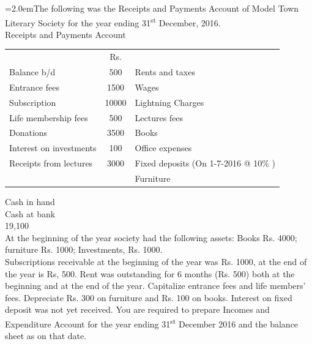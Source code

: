 \documentclass[11pt,a4paper]{article}
\newcommand{\lqn}[2]{\Needspace{6\baselineskip}\par\medskip\noindent\hangindent=2.0em\hangafter=1\makebox[2.0em][l]{\textbf{#1.}}#2\par}
\begin{document}
\lqn{26}{The following was the Receipts and Payments Account of Model Town Literary Society for the year ending 31\textsuperscript{st}  December, 2016.\\
Receipts and Payments Account\par
\par\smallskip\noindent\hspace*{1.2em}\begin{tabular}{lcl}
 & Rs. &  \\
Balance b/d & 500 & Rents and taxes \\
Entrance fees & 1500 & Wages \\
Subscription & 10000 & Lightning Charges \\
Life membership fees & 500 & Lectures fees \\
Donations & 3500 & Books \\
Interest on investments & 100 & Office expenses \\
Receipts from lectures & 3000 & Fixed deposits (On 1-7-2016 @ 10\% ) \\
 &  & Furniture \\
\end{tabular}\par\smallskip
Cash in hand\\
Cash at bank\\
19,100\\
At the beginning of the year society had the following assets: Books Rs. 4000; furniture Rs. 1000; Investments, Rs. 1000.\\
Subscriptions receivable at the beginning of the year was Rs. 1000, at the end of the year is Rs, 500. Rent was outstanding for 6 months (Rs. 500) both at the beginning and at the end of the year. Capitalize entrance fees and life members’ fees. Depreciate Rs. 300 on furniture and Rs. 100 on books. Interest on fixed deposit was not yet received. You are required to prepare Incomes and Expenditure Account for the year ending 31\textsuperscript{st}  December 2016 and the balance sheet as on that date.\par
}
\end{document}
